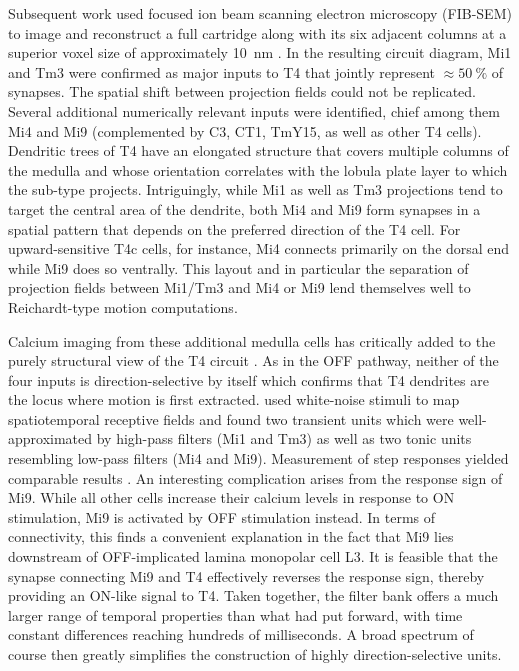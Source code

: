 Subsequent work used focused ion beam scanning electron microscopy (FIB-SEM) to image and reconstruct a full cartridge along with its six adjacent columns at a superior voxel size of approximately \SI{10}{\nano\meter} \citep{Takemura:2017aa}. In the resulting circuit diagram, Mi1 and Tm3 were confirmed as major inputs to T4 that jointly represent $\approx\SI{50}{\percent}$ of synapses. The spatial shift between projection fields could not be replicated. Several additional numerically relevant inputs were identified, chief among them Mi4 and Mi9 (complemented by C3, CT1, TmY15, as well as other T4 cells). Dendritic trees of T4 have an elongated structure that covers multiple columns of the medulla and whose orientation correlates with the lobula plate layer to which the sub-type projects. Intriguingly, while Mi1 as well as Tm3 projections tend to target the central area of the dendrite, both Mi4 and Mi9 form synapses in a spatial pattern that depends on the preferred direction of the T4 cell. For upward-sensitive T4c cells, for instance, Mi4 connects primarily on the dorsal end while Mi9 does so ventrally. This layout and in particular the separation of projection fields between Mi1/Tm3 and Mi4 or Mi9 lend themselves well to Reichardt-type motion computations.

Calcium imaging from these additional medulla cells has critically added to the purely structural view of the T4 circuit \citep{Strother:2014aa,Arenz:2017aa,Strother:2017aa}. As in the OFF pathway, neither of the four inputs is direction-selective by itself which confirms that T4 dendrites are the locus where motion is first extracted. \citet{Arenz:2017aa} used white-noise stimuli to map spatiotemporal receptive fields and found two transient units which were well-approximated by high-pass filters (Mi1 and Tm3) as well as two tonic units resembling low-pass filters (Mi4 and Mi9). Measurement of step responses yielded comparable results \citep{Strother:2017aa}. An interesting complication arises from the response sign of Mi9. While all other cells increase their calcium levels in response to ON stimulation, Mi9 is activated by OFF stimulation instead. In terms of connectivity, this finds a convenient explanation in the fact that Mi9 lies downstream of OFF-implicated lamina monopolar cell L3. It is feasible that the synapse connecting Mi9 and T4 effectively reverses the response sign, thereby providing an ON-like signal to T4. Taken together, the filter bank offers a much larger range of temporal properties than what \citet{Behnia:2014jh} had put forward, with time constant differences reaching hundreds of milliseconds. A broad spectrum of course then greatly simplifies the construction of highly direction-selective units.

